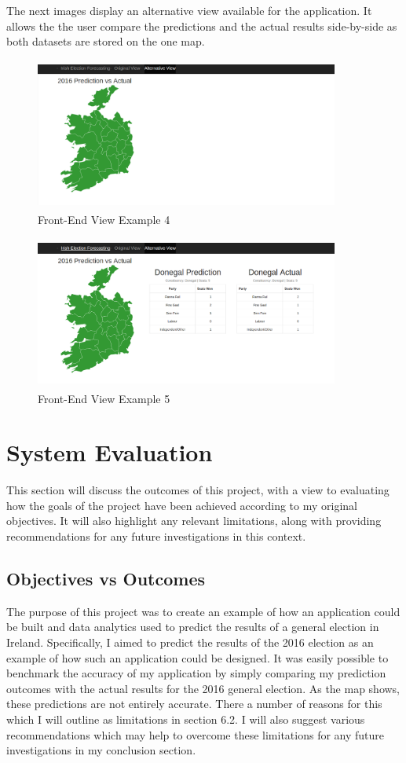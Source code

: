 The next images display an alternative view available for the application. It allows the the user compare the predictions and the actual results side-by-side as both datasets are stored on the one map. 
\begin{figure}[h]
	\caption{Front-End View Example 4}
	\centering
	\includegraphics[width=10cm, height=5cm]{img/view2part1}
\end{figure}
\begin{figure}[h]
	\caption{Front-End View Example 5}
	\centering
	\includegraphics[width=10cm, height=5cm]{img/view2part2}
\end{figure}
\chapter{System Evaluation}
This section will discuss the outcomes of this project, with a view to evaluating how the goals of the project have been achieved according to my original objectives. It will also highlight any relevant limitations, along with providing recommendations for any future investigations in this context.
\section{Objectives vs Outcomes}
The purpose of this project was to create an example of how an application could be built and data analytics used to predict the results of a general election in Ireland. Specifically, I aimed to predict the results of the 2016 election as an example of how such an application could be designed. It was easily possible to benchmark the accuracy of my application by simply comparing my prediction outcomes with the actual results for the 2016 general election. As the map shows, these predictions are not entirely accurate. There a number of reasons for this which I will outline as limitations in section 6.2. I will also suggest various recommendations which may help to overcome these limitations for any future investigations in my conclusion section.  

